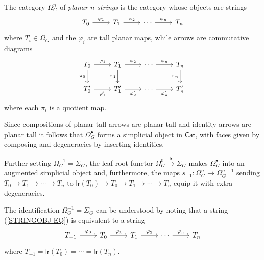\documentclass[a4paper,10pt]{article}%
\begin{document}
\begin{definition}
	The category $\Omega_{G}^n$ of 
	\textit{planar $n$-strings} is the category whose objects are strings
\begin{equation}\label{STRINGOBJ EQ}
	\begin{tikzcd}
	T_0 \ar{r}{\varphi_1} & T_1 \ar{r}{\varphi_2} & \cdots \ar{r}{\varphi_n} & T_n
	\end{tikzcd}	
\end{equation}
	where $T_i \in \Omega_G$ and the $\varphi_i$ are tall planar maps, while arrows are commutative diagrams 
	\begin{equation} \label{PTNARROW EQ}
	\begin{tikzcd}
	T_0 \ar{r}{\varphi_1} \ar{d}[swap]{\pi_0} & T_1 \ar{r}{\varphi_2} \ar{d}[swap]{\pi_1} & \cdots \ar{r}{\varphi_n} & T_n \ar{d}[swap]{\pi_n}
\\
	T'_0 \ar{r}[swap]{\varphi'_1} & T'_1 \ar{r}[swap]{\varphi'_2} & \cdots \ar{r}[swap]{\varphi'_n} & T'_n
	\end{tikzcd}	
	\end{equation}
where each $\pi_i$ is a quotient map.
\end{definition}


\begin{notation}\label{SIMPOPERATORS NOT}
	Since compositions of planar tall arrows are planar tall
	and identity arrows are planar tall	
	it follows that 
	$\Omega_{G}^{\bullet}$
	forms a simplicial object in $\mathsf{Cat}$, 
	with faces given by composing and degeneracies by inserting identities. 

	Further setting 
	$\Omega_{G}^{-1} = \Sigma_G$, the leaf-root functor $\Omega_{G}^{0} \xrightarrow{\mathsf{lr}} \Sigma_G$ makes 
	$\Omega_{G}^{\bullet}$ into an augmented simplicial object and, furthermore, the maps 
	$s_{-1} \colon \Omega_{G}^{n} \to \Omega_{G}^{n+1}$
sending $T_0 \to T_1 \to \cdots \to T_n$ to 
$\mathsf{lr}(T_0) \to T_0 \to T_1 \to \cdots \to T_n$ equip it with extra degeneracies.
\end{notation}


\begin{remark}
The identification $\Omega_{G}^{-1} = \Sigma_G$ can be understood by noting that a string  (\ref{STRINGOBJ EQ}) is equivalent to a string
\begin{equation}\label{STRINGOBJALT EQ}
	\begin{tikzcd}
	T_{-1} \ar{r}{\varphi_0} & T_0 \ar{r}{\varphi_1} & T_1 \ar{r}{\varphi_2} & \cdots \ar{r}{\varphi_n} & T_n
	\end{tikzcd}	
\end{equation}
where $T_{-1} = \mathsf{lr}(T_0) = \cdots = \mathsf{lr}(T_n)$.
\end{remark}
\end{document}
